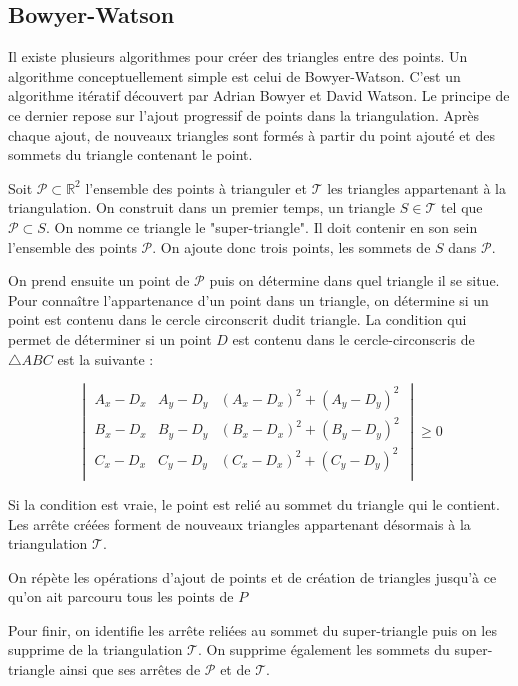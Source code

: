 \subsection{Bowyer-Watson}
Il existe plusieurs algorithmes pour créer des triangles entre des points.
Un algorithme conceptuellement simple est celui de Bowyer-Watson.
C'est un algorithme itératif découvert par Adrian Bowyer et David Watson.
Le principe de ce dernier repose sur l’ajout progressif de points dans la triangulation.
Après chaque ajout, de nouveaux triangles sont formés à partir du point ajouté et des sommets du triangle contenant le point.

Soit $\mathcal{P} \subset \mathbb{R}^2$ l'ensemble des points à trianguler et $\mathcal{T}$ les triangles appartenant à la triangulation. On construit dans un premier temps, un triangle $S \in \mathcal{T}$ tel que $\mathcal{P} \subset S$. On nomme ce triangle le "super-triangle". Il doit contenir en son sein l'ensemble des points $\mathcal{P}$. On ajoute donc trois points, les sommets de $S$ dans $\mathcal{P}$.

On prend ensuite un point de $\mathcal{P}$ puis on détermine dans quel triangle il se situe.
Pour connaître l'appartenance d'un point dans un triangle, on détermine si un point est contenu dans le cercle circonscrit dudit triangle.
La condition qui permet de déterminer si un point $D$ est contenu dans le cercle-circonscris de $\triangle ABC$ est la suivante :

$$
\begin{vmatrix}
 A_x - D_x & A_y - D_y & (A_x - D_x)^2 + (A_y - D_y)^2 \\
 B_x - D_x & B_y - D_y & (B_x - D_x)^2 + (B_y - D_y)^2 \\
 C_x - D_x & C_y - D_y & (C_x - D_x)^2 + (C_y - D_y)^2 \\
\end{vmatrix} \geqslant 0
$$

Si la condition est vraie, le point est relié au sommet du triangle qui le contient.
Les arrête créées forment de nouveaux triangles appartenant désormais à la
triangulation $\mathcal{T}$.

On répète les opérations d'ajout de points et de création de triangles jusqu'à ce qu'on ait parcouru tous les points de $P$

Pour finir, on identifie les arrête reliées au sommet du super-triangle puis on
les supprime de la triangulation $\mathcal{T}$.
On supprime également les sommets du super-triangle ainsi que ses arrêtes de 
$\mathcal{P}$ et de $\mathcal{T}$.

